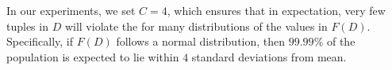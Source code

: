 %
In our experiments, we set $C = 4$, which ensures that in expectation, very few
tuples in $D$ will violate the \invariant for many distributions of the values
in $F(D)$. Specifically, if $F(D)$ follows a normal distribution, then
$99.99\%$ of the population is expected to lie within $4$ standard deviations
from mean. 



